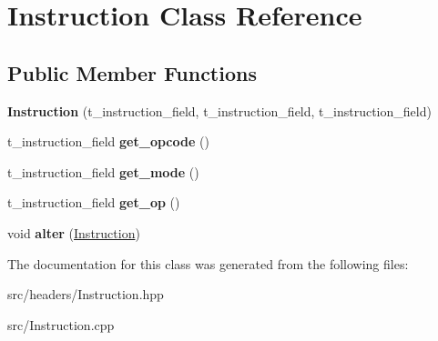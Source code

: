 \hypertarget{classInstruction}{\section{Instruction Class Reference}
\label{classInstruction}
}
\subsection*{Public Member Functions}
\begin{DoxyCompactItemize}
\item 
\hypertarget{classInstruction_a66648ef9a0855508c78a1e0e02f462c0}{{\bfseries Instruction} (t\-\_\-instruction\-\_\-field, t\-\_\-instruction\-\_\-field, t\-\_\-instruction\-\_\-field)}\label{classInstruction_a66648ef9a0855508c78a1e0e02f462c0}

\item 
\hypertarget{classInstruction_a1552cc0ae4d27c04cd60a63162249ef7}{t\-\_\-instruction\-\_\-field {\bfseries get\-\_\-opcode} ()}\label{classInstruction_a1552cc0ae4d27c04cd60a63162249ef7}

\item 
\hypertarget{classInstruction_a217dfdad3d5b53bd8db9f10c580ef473}{t\-\_\-instruction\-\_\-field {\bfseries get\-\_\-mode} ()}\label{classInstruction_a217dfdad3d5b53bd8db9f10c580ef473}

\item 
\hypertarget{classInstruction_a49b3545e6c2a409497a28cd3298f67cb}{t\-\_\-instruction\-\_\-field {\bfseries get\-\_\-op} ()}\label{classInstruction_a49b3545e6c2a409497a28cd3298f67cb}

\item 
\hypertarget{classInstruction_af1c0b9d351e1526192fe52e1963bad20}{void {\bfseries alter} (\hyperlink{classInstruction}{Instruction})}\label{classInstruction_af1c0b9d351e1526192fe52e1963bad20}

\end{DoxyCompactItemize}


The documentation for this class was generated from the following files\-:\begin{DoxyCompactItemize}
\item 
src/headers/Instruction.\-hpp\item 
src/Instruction.\-cpp\end{DoxyCompactItemize}
